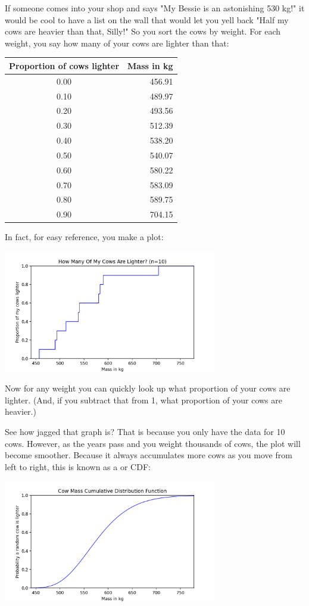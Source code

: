 If someone comes into your shop and says "My Bessie is an astonishing 530 kg!" it would be cool to have a list on the wall that would let you yell back "Half my cows are heavier than that, Silly!"  So you sort the cows by weight.  For each weight,  you say how many of your cows are lighter than that:

\begin{tabular}{c|r}
Proportion of cows lighter & Mass in kg \\
\hline
0.00 & 456.91 \\
0.10 & 489.97 \\
0.20 & 493.56 \\
0.30 & 512.39 \\
0.40 & 538.20 \\
0.50 & 540.07 \\
0.60 & 580.22 \\
0.70 & 583.09 \\
0.80 & 589.75 \\
0.90 & 704.15 \\
\end{tabular}

In fact, for easy reference,  you make a plot:

\includegraphics[width=0.7\textwidth]{cow_sample_cdf.png}

Now for any weight you can quickly look up what proportion of your cows are lighter.  (And, if you subtract that from 1,  what proportion of your cows are heavier.)

See how jagged that graph is?  That is because you only have the data for 10 cows.   However, as the years pass and you weight thousands of cows,  the plot will become smoother.   Because it
always accumulates more cows as you move from left to right,  this is known as a  or CDF:

\includegraphics[width=0.7\textwidth]{cow_cdf.png}

